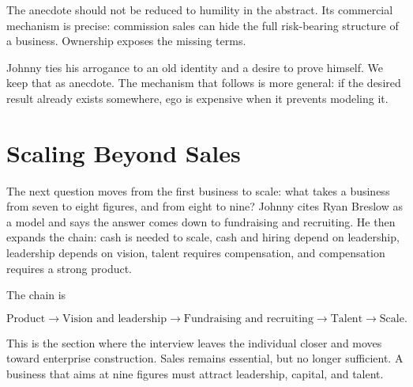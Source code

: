 \begin{remark}
The anecdote should not be reduced to humility in the abstract. Its commercial mechanism is precise: commission sales can hide the full risk-bearing structure of a business. Ownership exposes the missing terms.
\end{remark}

Johnny ties his arrogance to an old identity and a desire to prove himself. We keep that as anecdote. The mechanism that follows is more general: if the desired result already exists somewhere, ego is expensive when it prevents modeling it.

\section{Scaling Beyond Sales}

The next question moves from the first business to scale: what takes a business from seven to eight figures, and from eight to nine? Johnny cites Ryan Breslow as a model and says the answer comes down to fundraising and recruiting. He then expands the chain: cash is needed to scale, cash and hiring depend on leadership, leadership depends on vision, talent requires compensation, and compensation requires a strong product.

The chain is

\begin{equation}
\text{Product}
\longrightarrow
\text{Vision and leadership}
\longrightarrow
\text{Fundraising and recruiting}
\longrightarrow
\text{Talent}
\longrightarrow
\text{Scale}.
\end{equation}

This is the section where the interview leaves the individual closer and moves toward enterprise construction. Sales remains essential, but no longer sufficient. A business that aims at nine figures must attract leadership, capital, and talent.

